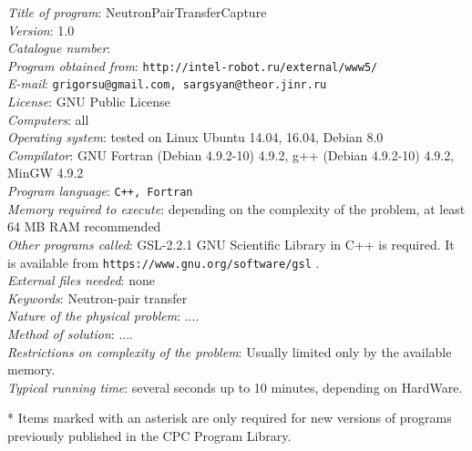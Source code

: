 \documentclass[preprint,review,12pt]{elsarticle}
\begin{document}
\begin{small}
  \noindent
  {\em Title of program\/}: NeutronPairTransferCapture \\
  {\em Version\/}: 1.0 \\
  {\em Catalogue number\/}: \\
  {\em Program obtained from\/}: {\tt http://intel-robot.ru/external/www5/} \\
  {\em E-mail\/}: {\tt grigorsu@gmail.com, sargsyan@theor.jinr.ru} \\
  {\em License\/}: GNU Public License \\
  {\em Computers\/}: all \\
  {\em Operating system\/}: tested on Linux Ubuntu 14.04, 16.04,  Debian 8.0  \\
  {\em Compilator\/}: GNU Fortran (Debian 4.9.2-10) 4.9.2, g++ (Debian 4.9.2-10) 4.9.2, MinGW 4.9.2  \\
  {\em Program language\/}: {\tt C++, Fortran    } \\
  {\em Memory required to execute\/}: 
       depending on the complexity of the problem, 
       at least 64 MB RAM recommended   \\
  {\em Other programs called\/}: GSL-2.2.1 GNU Scientific Library in C++ is required.
       It is available from  {\tt https://www.gnu.org/software/gsl} .\\
  {\em External files needed\/}: none \\
  {\em Keywords\/}:  Neutron-pair transfer \\
  {\em Nature of the physical problem\/}: 
  ....\\
  {\em Method of solution\/}: 
  ....\\ 
  {\em Restrictions on complexity of the problem\/}: 
  Usually limited only by the available memory. \\
  {\em Typical running time\/}: several seconds up to 10 minutes, depending on HardWare.


* Items marked with an asterisk are only required for new versions
of programs previously published in the CPC Program Library.\\
\end{small}
\end{document}
